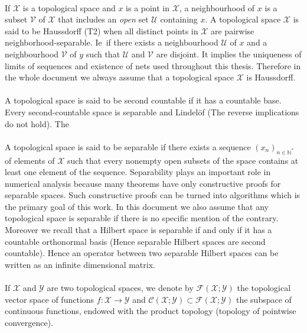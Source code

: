 \paragraph{}
If $\mathcal{X}$ is a topological space and $x$ is a point in $\mathcal{X}$, a
neighbourhood of $x$ is a subset $\mathcal{V}$ of $\mathcal{X}$ that includes
an \emph{open} set $\mathcal{U}$ containing $x$. A topological space
$\mathcal{X}$ is said to be Haussdorff (T2) when all distinct points in
$\mathcal{X}$ are pairwise neighborhood-separable. \acs{Ie}~if there exists a
neighbourhood $\mathcal{U}$ of $x$ and a neighbourhood $\mathcal{V}$ of $y$
such that $\mathcal{U}$ and $\mathcal{V}$ are disjoint. It implies the
uniqueness of limits of sequences and existence of nets used throughout this
thesis. Therefore in the whole document we always assume that a topological
space $\mathcal{X}$ is Haussdorff.
\paragraph{}
A topological space is said to be second countable if it has a countable base.
Every second-countable space is separable and Lindel\"of (The reverse
implications do not hold). The
\paragraph{}
A topological space is said to be separable if there exists a sequence
$(x_n)_{n\in\mathbb{N}^*}$ of elements of $\mathcal{X}$ such that every
nonempty open subsets of the space contains at least one element of the
sequence. Separability plays an important role in numerical analysis because
many theorems have only constructive proofs for separable spaces. Such
constructive proofs can be turned into algorithms which is the primary goal of
this work. In this document we also assume that any topological space is
separable if there is no specific mention of the contrary. Moreover we recall
that a Hilbert space is separable if and only if it has a countable orthonormal
basis (Hence separable Hilbert spaces are second countable). Hence an operator
between two separable Hilbert spaces can be written as an infinite dimensional
matrix.
\paragraph{}
If $\mathcal{X}$ and $\mathcal{Y}$ are two topological spaces, we denote by
$\mathcal{F}(\mathcal{X};\mathcal{Y})$ the topological vector space of
functions $f:\mathcal{X}\to\mathcal{Y}$ and
$\mathcal{C}(\mathcal{X};\mathcal{Y}) \subset
\mathcal{F}(\mathcal{X};\mathcal{Y})$ the subspace of continuous functions,
endowed with the product topology (topology of pointwise convergence).

